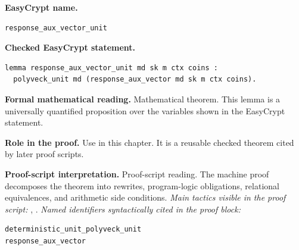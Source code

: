 \begin{formaltheorem}
\noindent\textbf{EasyCrypt name.}
\begin{lstlisting}[language=EasyCrypt,basicstyle=\ttfamily\scriptsize]
response_aux_vector_unit
\end{lstlisting}
\noindent\textbf{Checked EasyCrypt statement.}
\begin{lstlisting}[language=EasyCrypt,basicstyle=\ttfamily\scriptsize]
lemma response_aux_vector_unit md sk m ctx coins :
  polyveck_unit md (response_aux_vector md sk m ctx coins).
\end{lstlisting}
\noindent\textbf{Formal mathematical reading.}
Mathematical theorem. This lemma is a universally quantified proposition over the variables shown in the EasyCrypt statement.

\noindent\textbf{Role in the proof.}
Use in this chapter. It is a reusable checked theorem cited by later proof scripts.

\noindent\textbf{Proof-script interpretation.}
Proof-script reading. The machine proof decomposes the theorem into rewrites, program-logic obligations, relational equivalences, and arithmetic side conditions.
\emph{Main tactics visible in the proof script:} , .
\emph{Named identifiers syntactically cited in the proof block:}
\begin{lstlisting}[language=EasyCrypt,basicstyle=\ttfamily\scriptsize]
deterministic_unit_polyveck_unit
response_aux_vector
\end{lstlisting}

\end{formaltheorem}

